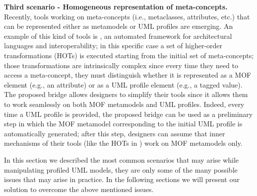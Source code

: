 \textbf{Third scenario - Homogeneous representation of meta-concepts.}
Recently, tools working on meta-concepts (i.e., metaclasses, attributes, etc.) 
that can be represented either as metamodels or UML profiles are emerging. 
An example of this kind of tools is \dually{}, 
an automated framework for architectural languages and interoperability\cite{duallyTSE}; in this specific case a set of higher-order
 transformations (HOTs) is executed starting from the initial set of meta-concepts; those transformations are intrinsically complex since
every time they need to access a meta-concept,
they must distinguish whether it is represented as a MOF element (e.g., an attribute) or as a UML profile element (e.g., a tagged value).
The proposed bridge allows designers to simplify their tools since it allows them to work seamlessly on both MOF metamodels and UML profiles. Indeed, every time a UML profile is provided, the proposed bridge can be used as a preliminary step in which 
the MOF metamodel corresponding to the initial UML profile is automatically generated; 
after this step, designers can assume that inner mechanisms of their tools (like the HOTs in \dually{}) work on MOF metamodels only. 

In this section we described the most common scenarios that may arise while manipulating profiled UML models,
they are only some of the many possible issues that may arise in practice. In the following sections we will present
our solution to overcome the above mentioned issues.

